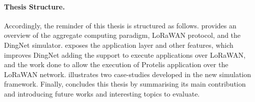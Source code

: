 %
\paragraph{Thesis Structure.} %
Accordingly, the reminder of this thesis is structured as follows.
%
 provides an overview of the aggregate computing paradigm, \mbox{LoRaWAN} protocol, and the DingNet simulator.
% 
 exposes the application layer and other features, which improves DingNet adding the support to execute applications over LoRaWAN, and the work done to allow the execution of Protelis application over the LoRaWAN network.
%  
 illustrates two case-studies developed in the new simulation framework.
% 
Finally,  concludes this thesis by summarising its main contribution and introducing future works and interesting topics to evaluate.